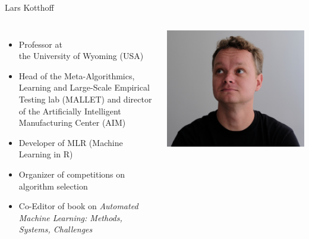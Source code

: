\begin{frame}[c]{Lars Kotthoff}

\begin{columns}


	\begin{itemize}
		\item Professor at\\ the University of Wyoming (USA)
        \item Head of the Meta-Algorithmics, Learning and Large-Scale Empirical Testing lab
            (MALLET) and director of the Artificially Intelligent Manufacturing
            Center (AIM)
		\item Developer of MLR (Machine Learning in R)
		\item Organizer of competitions on algorithm selection
    	\item Co-Editor of book on \textit{Automated Machine Learning:	Methods, Systems, Challenges}
	\end{itemize}


	\includegraphics[width=1.0\textwidth]{images/kotthoff.jpg}

\end{columns}

\end{frame}
